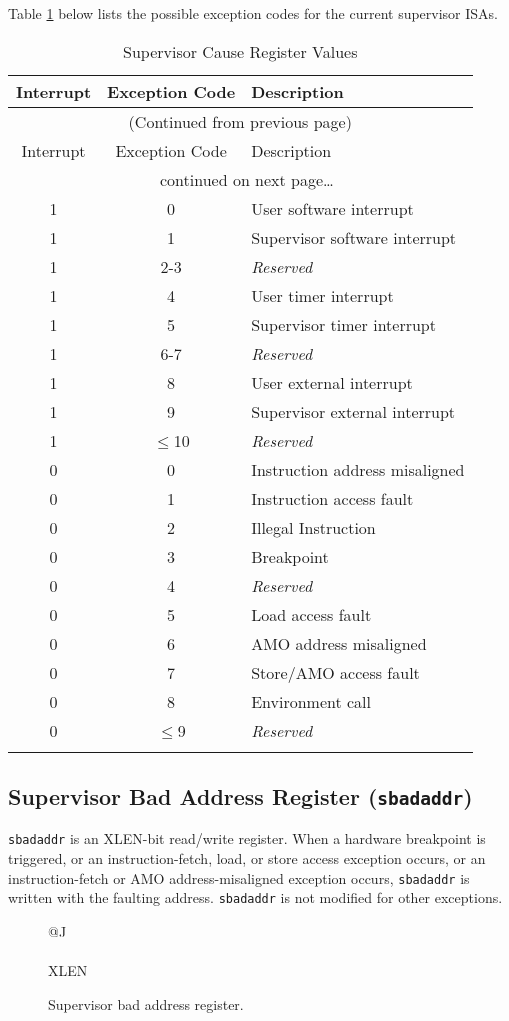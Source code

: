 Table \ref{tab:scause-reg-values} below lists the possible exception codes for the current supervisor ISAs.

\begin{longtable}[]{@{}ccl@{}}
\toprule
Interrupt & Exception Code & Description\tabularnewline
\midrule
\endfirsthead
\multicolumn{3}{c}{{(Continued from previous page)}} \\

\toprule
Interrupt & Exception Code & Description\tabularnewline
\midrule
\endhead

\midrule \multicolumn{3}{c}{{\tablename\ \thetable{} continued on next page\ldots}} \\
\endfoot

\endlastfoot

1 & 0 & User software interrupt\tabularnewline
1 & 1 & Supervisor software interrupt\tabularnewline
1 & 2-3 & \emph{Reserved}\tabularnewline
1 & 4 & User timer interrupt\tabularnewline
1 & 5 & Supervisor timer interrupt\tabularnewline
1 & 6-7 & \emph{Reserved}\tabularnewline
1 & 8 & User external interrupt\tabularnewline
1 & 9 & Supervisor external interrupt\tabularnewline
1 & $\leqslant$10 & \emph{Reserved}\tabularnewline
\midrule
0 & 0 & Instruction address misaligned\tabularnewline
0 & 1 & Instruction access fault\tabularnewline
0 & 2 & Illegal Instruction\tabularnewline
0 & 3 & Breakpoint\tabularnewline
0 & 4 & \emph{Reserved}\tabularnewline
0 & 5 & Load access fault\tabularnewline
0 & 6 & AMO address misaligned\tabularnewline
0 & 7 & Store/AMO access fault\tabularnewline
0 & 8 & Environment call\tabularnewline
0 & $\leqslant$9 & \emph{Reserved}\tabularnewline
\bottomrule
\caption{Supervisor Cause Register Values}
\label{tab:scause-reg-values}
\end{longtable}

\subsection{Supervisor Bad Address Register
({\tt sbadaddr})}\label{supervisor-bad-address-register-sbadaddr}

{\tt sbadaddr} is an XLEN-bit read/write register. When a hardware breakpoint is triggered, or an instruction-fetch,
load, or store access exception occurs, or an instruction-fetch or AMO
address-misaligned exception occurs, {\tt sbadaddr} is written with the
faulting address. {\tt sbadaddr} is not modified for other exceptions.

\begin{figure}[h!]
	{\footnotesize
		\begin{center}
			\begin{tabular}{@{}J}
				 \\
				\hline
				 \\
				\hline
				XLEN \\
			\end{tabular}
		\end{center}
	}
	\vspace{-0.1in}
	\caption{Supervisor bad address register.}
	\label{badvaddrreg}
\end{figure}

